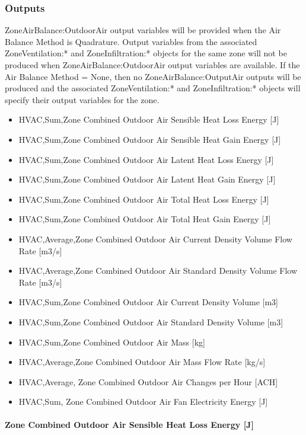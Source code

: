 \subsubsection{Outputs}\label{outputs-2-002}

ZoneAirBalance:OutdoorAir output variables will be provided when the Air Balance Method is Quadrature. Output variables from the associated ZoneVentilation:* and ZoneInfiltration:* objects for the same zone will not be produced when ZoneAirBalance:OutdoorAir output variables are available. If the Air Balance Method = None, then no ZoneAirBalance:OutputAir outputs will be produced and the associated ZoneVentilation:* and ZoneInfiltration:* objects will specify their output variables for the zone.

\begin{itemize}
\item
  HVAC,Sum,Zone Combined Outdoor Air Sensible Heat Loss Energy {[}J{]}
\item
  HVAC,Sum,Zone Combined Outdoor Air Sensible Heat Gain Energy {[}J{]}
\item
  HVAC,Sum,Zone Combined Outdoor Air Latent Heat Loss Energy {[}J{]}
\item
  HVAC,Sum,Zone Combined Outdoor Air Latent Heat Gain Energy {[}J{]}
\item
  HVAC,Sum,Zone Combined Outdoor Air Total Heat Loss Energy {[}J{]}
\item
  HVAC,Sum,Zone Combined Outdoor Air Total Heat Gain Energy {[}J{]}
\item
  HVAC,Average,Zone Combined Outdoor Air Current Density Volume Flow Rate {[}m3/s{]}
\item
  HVAC,Average,Zone Combined Outdoor Air Standard Density Volume Flow Rate {[}m3/s{]}
\item
  HVAC,Sum,Zone Combined Outdoor Air Current Density Volume {[}m3{]}
\item
  HVAC,Sum,Zone Combined Outdoor Air Standard Density Volume {[}m3{]}
\item
  HVAC,Sum,Zone Combined Outdoor Air Mass {[}kg{]}
\item
  HVAC,Average,Zone Combined Outdoor Air Mass Flow Rate {[}kg/s{]}
\item
  HVAC,Average, Zone Combined Outdoor Air Changes per Hour {[}ACH{]}
\item
  HVAC,Sum, Zone Combined Outdoor Air Fan Electricity Energy {[}J{]}
\end{itemize}

\paragraph{Zone Combined Outdoor Air Sensible Heat Loss Energy {[}J{]}}\label{zone-combined-outdoor-air-sensible-heat-loss-energy-j}

